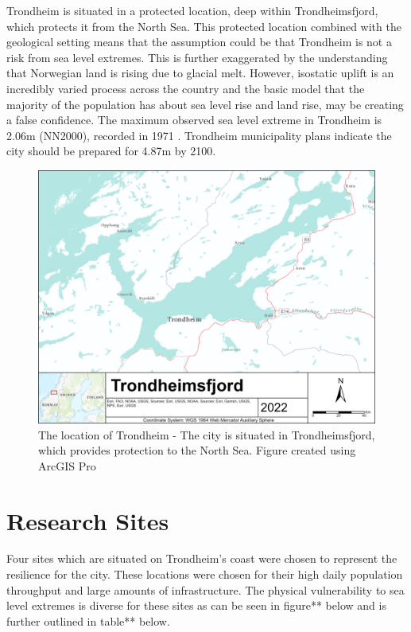 Trondheim is situated in a protected location, deep within Trondheimsfjord, which protects it from the North Sea. This protected location combined with the geological setting means that the assumption could be that Trondheim is not a risk from sea level extremes. This is further exaggerated by the understanding that Norwegian land is rising due to glacial melt. However, isostatic uplift is an incredibly varied process across the country and the basic model that the majority of the population has about sea level rise and land rise, may be creating a false confidence.  The maximum observed sea level extreme in Trondheim is 2.06m (NN2000), recorded in 1971 \cite{tides_high_2022}. Trondheim municipality plans indicate the city should be prepared for 4.87m by 2100. 

\begin{figure}[h!]
    \centering
    \includegraphics[width=1.0\textwidth]{fig/Trondheimsfjord.png}
    \caption{The location of Trondheim - The city is situated in Trondheimsfjord, which provides protection to the North Sea. Figure created using ArcGIS Pro}
    \label{fig:research area Trondheim}
\end{figure}



\section{Research Sites}
Four sites which are situated on Trondheim's coast were chosen to represent the resilience for the city. These locations were chosen for their high daily population throughput and large amounts of infrastructure. The physical vulnerability to sea level extremes is diverse for these sites as can be seen in figure** below and is further outlined in table** below. 
